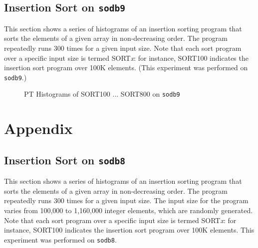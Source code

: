 \documentclass[10pt]{article}
\begin{document}
\clearpage
\pagebreak

\subsection{Insertion Sort on {\tt sodb9}~\label{sec:new_ins_sort}} 
This section shows a series of histograms of an insertion sorting program that 
sorts the elements of a given array in non-decreasing order. 
The program repeatedly runs 300 times for a given input size. 
Note that each sort program over a specific input size is termed SORT{\it x}: 
for instance, SORT100 indicates the insertion sort program over 100K elements. 
(This experiment was performed on {\tt sodb9}.)

\begin{figure}[htp!]
	\centering
	\caption{PT Histograms of SORT100 ... SORT800 on {\tt sodb9}~\label{fig:new_s9_sort1}}
\end{figure}

\newpage
\pagebreak

\section{Appendix}

\subsection{Insertion Sort on {\tt sodb8}~\label{sec:add_new}} 
This section shows a series of histograms of an insertion sorting program that 
sorts the elements of a given array in non-decreasing order. 
The program repeatedly runs 300 times for a given input size. 
The input size for the program 
varies from 100,000 to 1,160,000 integer elements, which are randomly generated. 
Note that each sort program over a specific input size is termed SORT{\it x}: 
for instance, SORT100 indicates the insertion sort program over 100K elements. 
This experiment was performed on {\tt sodb8}.
\end{document}
